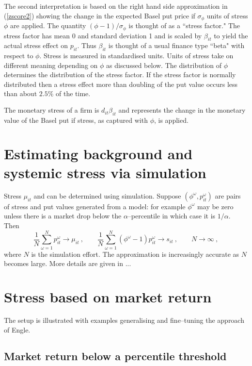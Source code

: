 \documentclass[authoryear]{elsarticle}
\renewcommand{\o}{\omega}
\newcommand{\eref}[1]{(\ref{#1})}
\newcommand{\cq}{\ , \qquad}
\newcommand{\be}[1]{\begin{equation}\label{#1}}
\newcommand{\ee}{\end{equation}}
\begin{document}
The second interpretation is based on  the right hand side approximation in \eref{zscore2} showing   the change in the  expected Basel put price if  $\sigma_\phi$ units of stress $\phi$ are applied.  The quantity $(\phi-1)/\sigma_\phi$ is thought of as a ``stress factor."   The stress factor has mean 0 and standard deviation 1 and is scaled by $\beta_{it}$ to yield the actual stress effect on  $p_{it}$.  Thus  $\beta_{it}$ is thought of a usual finance type ``beta" with respect to $\phi$.   Stress is measured in standardised units.  Units of stress take on different meaning depending on  $\phi$ as discussed below. The distribution of $\phi$ determines the distribution of the stress factor. If the stress factor is normally distributed then a stress effect more than doubling of the put value  occurs less than about $2.5\%$ of the time. 

      

The  monetary stress of a firm is 
$
d_{it}\beta_{it}
$
and represents the change in the monetary value of the Basel put  if stress, as captured with $\phi$, is applied. 

\section{Estimating background and systemic stress via simulation}

Stress $\mu_{it}$ and can be determined using simulation.   Suppose $(\phi^\o,p_{it}^\o)$ are pairs of stress and put values generated from a model: for example $\phi^\o$ may be zero unless there is a market drop below the $\alpha$--percentile in which case it is $1/\alpha$. 
Then 
\be{simulate}
\frac{1}{N}\sum_{\o=1}^N p_{it}^\o\rightarrow \mu_{it}\cq \frac{1}{N}\sum_{\o=1}^N (\phi^\o-1)p_{it}^\o\rightarrow s_{it} \cq N\rightarrow\infty\ ,
\ee
where $N$ is the simulation effort.  The approximation is increasingly accurate as $N$ becomes large.   More details are given in ...





\section{Stress based on  market return}\label{marketstress}
The setup is illustrated with  examples generalising and fine--tuning the approach of Engle.

\subsection{Market return below a percentile threshold} 
\end{document}
